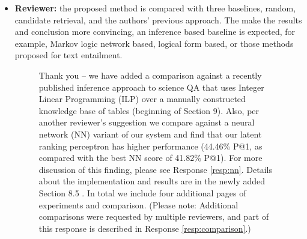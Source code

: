 \documentclass[10pt]{article}
\begin{document}
\begin{itemize}
\item \textbf{Reviewer:} the proposed method is compared with three baselines, random, candidate
retrieval, and the authors' previous approach. The make the results and
conclusion more convincing, an inference based baseline is expected, for
example, Markov logic network based, logical form based, or those methods
proposed for text entailment.

\begin{figure}[H]
\caption{Thank you -- we have added a comparison against a recently published inference approach to science QA that uses Integer Linear Programming (ILP) over a manually constructed knowledge base of tables (beginning of Section 9). Also, per another reviewer's suggestion we compare against a neural network (NN) variant of our system and find that our latent ranking perceptron has higher performance (44.46\% P@1, as compared with the best NN score of 41.82\% P@1).  For more discussion of this finding, please see Response \ref{resp:nn}.  Details about the implementation and results are in the newly added Section 8.5 .  In total we include four additional pages of experiments and comparison. (Please note: Additional comparisons were requested by multiple reviewers, and part of this response is described in Response \ref{resp:comparison}.)
}
\label{resp:logiccomp}
\end{figure}


\end{itemize}

\end{document}
